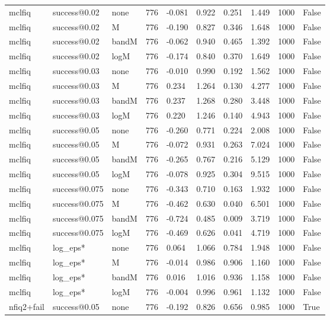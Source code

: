 \begin{tabular}{llllllllll}
mclfiq & success@0.02 & none & 776 & -0.081 & 0.922 & 0.251 & 1.449 & 1000 & False \\
mclfiq & success@0.02 & M & 776 & -0.190 & 0.827 & 0.346 & 1.648 & 1000 & False \\
mclfiq & success@0.02 & bandM & 776 & -0.062 & 0.940 & 0.465 & 1.392 & 1000 & False \\
mclfiq & success@0.02 & logM & 776 & -0.174 & 0.840 & 0.370 & 1.649 & 1000 & False \\
mclfiq & success@0.03 & none & 776 & -0.010 & 0.990 & 0.192 & 1.562 & 1000 & False \\
mclfiq & success@0.03 & M & 776 & 0.234 & 1.264 & 0.130 & 4.277 & 1000 & False \\
mclfiq & success@0.03 & bandM & 776 & 0.237 & 1.268 & 0.280 & 3.448 & 1000 & False \\
mclfiq & success@0.03 & logM & 776 & 0.220 & 1.246 & 0.140 & 4.943 & 1000 & False \\
mclfiq & success@0.05 & none & 776 & -0.260 & 0.771 & 0.224 & 2.008 & 1000 & False \\
mclfiq & success@0.05 & M & 776 & -0.072 & 0.931 & 0.263 & 7.024 & 1000 & False \\
mclfiq & success@0.05 & bandM & 776 & -0.265 & 0.767 & 0.216 & 5.129 & 1000 & False \\
mclfiq & success@0.05 & logM & 776 & -0.078 & 0.925 & 0.304 & 9.515 & 1000 & False \\
mclfiq & success@0.075 & none & 776 & -0.343 & 0.710 & 0.163 & 1.932 & 1000 & False \\
mclfiq & success@0.075 & M & 776 & -0.462 & 0.630 & 0.040 & 6.501 & 1000 & False \\
mclfiq & success@0.075 & bandM & 776 & -0.724 & 0.485 & 0.009 & 3.719 & 1000 & False \\
mclfiq & success@0.075 & logM & 776 & -0.469 & 0.626 & 0.041 & 4.719 & 1000 & False \\
mclfiq & log\_eps* & none & 776 & 0.064 & 1.066 & 0.784 & 1.948 & 1000 & False \\
mclfiq & log\_eps* & M & 776 & -0.014 & 0.986 & 0.906 & 1.160 & 1000 & False \\
mclfiq & log\_eps* & bandM & 776 & 0.016 & 1.016 & 0.936 & 1.158 & 1000 & False \\
mclfiq & log\_eps* & logM & 776 & -0.004 & 0.996 & 0.961 & 1.132 & 1000 & False \\
nfiq2+fail & success@0.05 & none & 776 & -0.192 & 0.826 & 0.656 & 0.985 & 1000 & True \\

\end{tabular}
